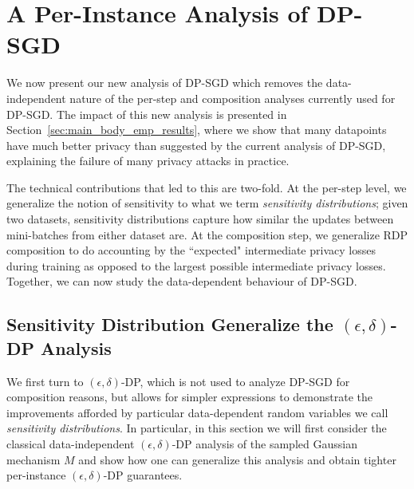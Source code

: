 \section{A Per-Instance Analysis of DP-SGD}
\label{sec:analysis}





We now present our new analysis of DP-SGD which removes the data-independent nature of the per-step and composition analyses currently used for DP-SGD. The impact of this new analysis is presented in Section~\ref{sec:main_body_emp_results}, where we show that many datapoints have much better privacy than suggested by the current analysis of DP-SGD, explaining the failure of many privacy attacks in practice.

The technical contributions that led to this are two-fold. At the per-step level, we generalize the notion of sensitivity to what we term \emph{sensitivity distributions}; given two datasets, sensitivity distributions capture how similar the updates between mini-batches from either dataset are. At the composition step, we generalize RDP composition to do accounting by the ``expected" intermediate privacy losses during training as opposed to the largest possible intermediate privacy losses. Together, we can now study the data-dependent behaviour of DP-SGD.





\subsection{Sensitivity Distribution Generalize the $(\epsilon,\delta)$-DP Analysis}
\label{ssec:eps_delta_case}




We first turn to $(\epsilon,\delta)$-DP, which is not used to analyze DP-SGD for composition reasons, but allows for simpler expressions to demonstrate the improvements afforded by particular data-dependent random variables we call \textit{sensitivity distributions}. In particular, in this section we will first consider the classical data-independent $(\epsilon,\delta)$-DP analysis of the sampled Gaussian mechanism $M$ and show how one can generalize this analysis and obtain tighter per-instance $(\epsilon,\delta)$-DP guarantees.


